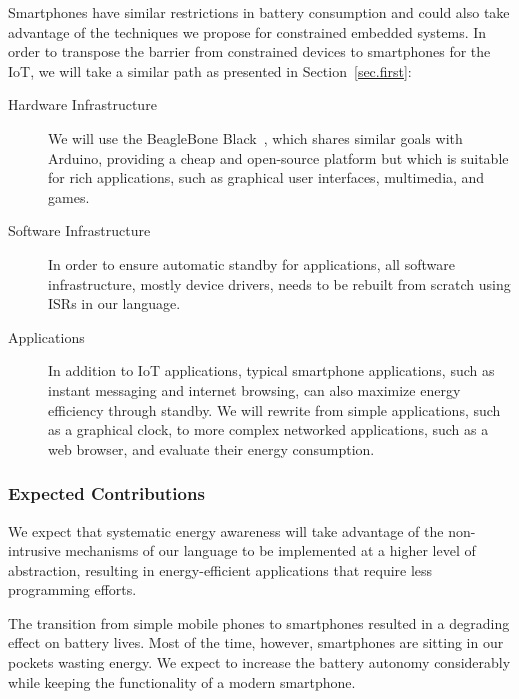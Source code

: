 \documentclass[12pt,english]{amsart}
\begin{document}
Smartphones have similar restrictions in battery consumption and could also
take advantage of the techniques we propose for constrained embedded systems.
%
In order to transpose the barrier from constrained devices to smartphones for
the IoT, we will take a similar path as presented in Section~\ref{sec.first}:
%
\begin{description}
\item[Hardware Infrastructure]
We will use the BeagleBone Black~\cite{bbb.manual}, which shares similar goals with
Arduino, providing a cheap and open-source platform but which is suitable for rich
applications, such as graphical user interfaces, multimedia, and games.
\item[Software Infrastructure]
In order to ensure automatic standby for applications, all software
infrastructure, mostly device drivers, needs to be rebuilt from scratch using
ISRs in our language.
\item[Applications]
In addition to IoT applications, typical smartphone applications, such as
instant messaging and internet browsing, can also maximize energy efficiency
through standby.
We will rewrite from simple applications, such as a graphical clock, to more
complex networked applications, such as a web browser, and evaluate their energy consumption.
\end{description}

\subsubsection{\textbf{Expected Contributions}}


    We expect that systematic energy awareness will take advantage of the
    non-intrusive mechanisms of our language to be implemented at a higher
    level of abstraction, resulting in energy-efficient applications that
    require less programming efforts.

    The transition from simple mobile phones to smartphones resulted in a
    degrading effect on battery lives.
    Most of the time, however, smartphones are sitting in our pockets wasting
    energy.
    We expect to increase the battery autonomy considerably while keeping the
    functionality of a modern smartphone.
\end{document}
